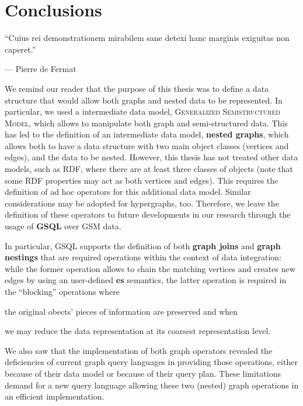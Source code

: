 \chapter{Conclusions}\label{cha:IteMissaEst}
\epigraph{``Cuius rei demonstrationem mirabilem sane detexi hanc marginis exiguitas non caperet.''}{--- Pierre de Fermat}

We remind our reader that the purpose of this thesis was to define a data structure that would allow both graphs and nested data to be represented. In particular, we used a intermediate data model, \textsc{Generalized Semistructured Model}, which allows to manipulate both graph and semi-structured data. This has led to the definition of an intermediate data model, \textbf{nested graphs}, which allows both to have a data structure with two main object classes (vertices and edges), and the data to be nested. However, this thesis has not treated other data models, such as RDF, where there are at least three classes of objects (note that some RDF properties may act as both vertices and edges). This requires the definition of ad hoc operators for this additional data model. Similar considerations may be adopted for hypergraphs, too. Therefore, we leave the definition of these operators  to future developments in our research through the usage of \textbf{GSQL} over GSM data. %

In particular, GSQL supports the definition of both \textbf{graph joins} and \textbf{graph nestings} that are required operations within the context of data integration: while the former operation allows to chain the matching vertices and creates new edges by using an user-defined \textbf{es} semantics, the latter operation is required in the ``blocking'' operations where \begin{mylist}
	\item the original obects' pieces of information are preserved and when
	\item we may reduce the data representation at its coarsest representation level.
\end{mylist}
We also saw that the implementation of both graph operators revealed the deficiencies of current graph query languages in providing those operations, either because of their data model or because of their query plan. These limitations demand for a new query language allowing these two (nested) graph operations in an efficient implementation. 

